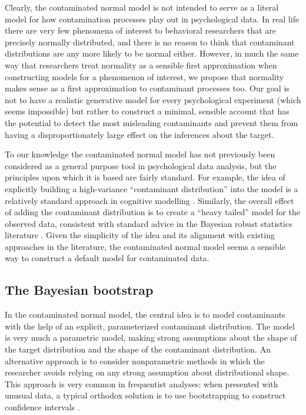 \documentclass[doc]{apa6}
\begin{document}
{Clearly, the contaminated normal model is not intended to serve as a literal model for how contamination processes play out in psychological data. In real life there are very few phenomena of interest to behavioral researchers that are precisely normally distributed, and there is no reason to think that contaminant distributions are any more likely to be normal either. However, in much the same way that researchers treat normality as a sensible first approximation when constructing models for a phenomenon of interest, we propose that normality makes sense as a first approximation to contaminant processes too. Our goal is not to have a realistic generative model for every psychological experiment (which seems impossible) but rather to construct a minimal, sensible account that has the potential to detect the most misleading contaminants and prevent them from having a disproportionately large effect on the inferences about the target.

To our knowledge the contaminated normal model has not previously been considered as a general purpose tool in psychological data analysis, but the principles upon which it is based are fairly standard. For example, the idea of explicitly building a high-variance ``contaminant distribution'' into the model is a relatively standard approach in cognitive modelling \parencite[e.g.,][]{zeigenfuse_general_2010,ratcliff_estimating_2002}. Similarly, the overall effect of adding the contaminant distribution is to create a ``heavy tailed'' model for the observed data, consistent with standard advice in the Bayesian robust statistics literature \parencite[e.g.,][]{berger_overview_1994}. Given the simplicity of the idea and its alignment with existing approaches in the literature, the contaminated normal model seems a sensible way to construct a default model for contaminated data.


\subsection{The Bayesian bootstrap}

In the contaminated normal model, the central idea is to model contaminants with the help of an explicit, parameterized contaminant distribution. The model is very much a parametric model, making strong assumptions about the shape of the target distribution and the shape of the contaminant distribution. An alternative approach is to consider nonparametric methods in which the researcher avoids relying on any strong assumption about distributional shape. This approach is very common in frequentist analyses: when presented with unusual data, a typical orthodox solution is to use bootstrapping \parencite{efron1994introduction} to construct confidence intervals \parencite{hall1988symmetric,efron1987better}.

}
\end{document}
